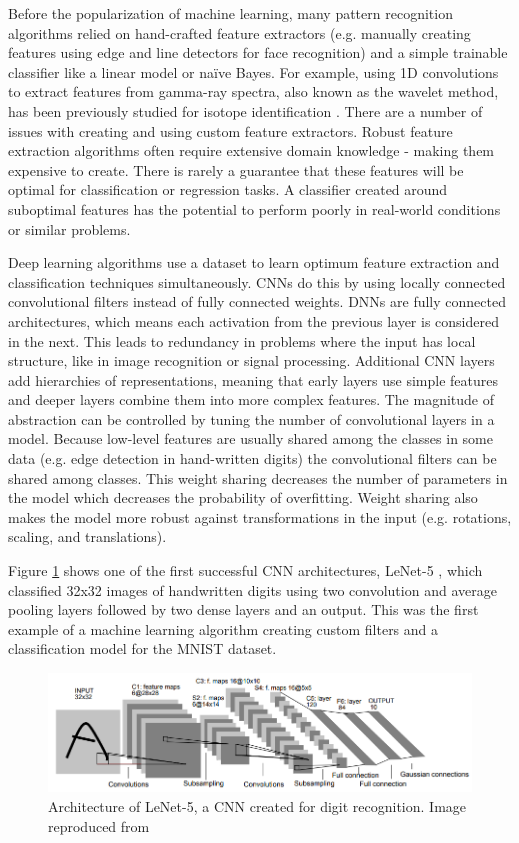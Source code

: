 Before the popularization of machine learning, many pattern recognition algorithms relied on hand-crafted feature extractors (e.g. manually creating features using edge and line detectors for face recognition) and a simple trainable classifier like a linear model or na{\"i}ve Bayes. For example, using 1D convolutions to extract features from gamma-ray spectra, also known as the wavelet method, has been previously studied for isotope identification \cite{xiong2015, lu2013, sullivan2004, sullivan2006}. There are a number of issues with creating and using custom feature extractors. Robust feature extraction algorithms often require extensive domain knowledge - making them expensive to create. There is rarely a guarantee that these features will be optimal for classification or regression tasks. A classifier created around suboptimal features has the potential to perform poorly in real-world conditions or similar problems.

Deep learning algorithms use a dataset to learn optimum feature extraction and classification techniques simultaneously. CNNs do this by using locally connected convolutional filters instead of fully connected weights. DNNs are fully connected architectures, which means each activation from the previous layer is considered in the next. This leads to redundancy in problems where the input has local structure, like in image recognition or signal processing. Additional CNN layers add hierarchies of representations, meaning that early layers use simple features and deeper layers combine them into more complex features. The magnitude of abstraction can be controlled by tuning the number of convolutional layers in a model. Because low-level features are usually shared among the classes in some data (e.g. edge detection in hand-written digits) the convolutional filters can be shared among classes. This weight sharing decreases the number of parameters in the model which decreases the probability of overfitting. Weight sharing also makes the model more robust against transformations in the input (e.g. rotations, scaling, and translations).

Figure \ref{fig:cnn_mnist_lecun98} shows one of the first successful CNN architectures, LeNet-5 \cite{Lecun1998}, which classified 32x32 images of handwritten digits using two convolution and average pooling layers followed by two dense layers and an output. This was the first example of a machine learning algorithm creating custom filters and a classification model for the MNIST dataset. 

\begin{figure}[H]
	\centering
	\includegraphics[width=0.85\linewidth]{images/cnn_mnist_lecun98}
	\caption{Architecture of LeNet-5, a CNN created for digit recognition. Image reproduced from \cite{Lecun1998}}
	\label{fig:cnn_mnist_lecun98}
\end{figure}

